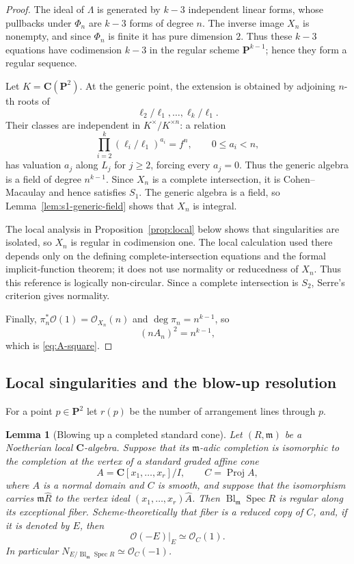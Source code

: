 \documentclass[11pt]{article}
\newtheorem{lemma}[theorem]{Lemma}
\newcommand{\PP}{\mathbf P}
\newcommand{\CC}{\mathbf C}
\newcommand{\OO}{\mathcal O}
\newcommand{\Bl}{\operatorname{Bl}}
\begin{document}
\begin{proof}
The ideal of $\Lambda$ is generated by $k-3$ independent linear forms, whose
pullbacks under $\Phi_n$ are $k-3$ forms of degree $n$.  The inverse image $X_n$
is nonempty, and since $\Phi_n$ is finite it has pure dimension $2$.  Thus these
$k-3$ equations have codimension $k-3$ in the regular scheme $\PP^{k-1}$; hence
they form a regular sequence.

Let $K=\CC(\PP^2)$.  At the generic point, the extension is obtained by adjoining
$n$-th roots of
\[
        \ell_2/\ell_1,\ldots,\ell_k/\ell_1.
\]
Their classes are independent in $K^\times/K^{\times n}$: a relation
\[
 \prod_{i=2}^k(\ell_i/\ell_1)^{a_i}=f^n,
 \qquad 0\le a_i<n,
\]
has valuation $a_j$ along $L_j$ for $j\ge2$, forcing every $a_j=0$.  Thus the
generic algebra is a field of degree $n^{k-1}$.  Since $X_n$ is a complete intersection, it is Cohen--Macaulay and hence satisfies
$S_1$.  The generic algebra is a field, so Lemma~\ref{lem:s1-generic-field}
shows that $X_n$ is integral.

The local analysis in Proposition~\ref{prop:local} below shows that singularities
are isolated, so $X_n$ is regular in codimension one.  The local calculation
used there depends only on the defining complete-intersection equations and the
formal implicit-function theorem; it does not use normality or reducedness of
$X_n$.  Thus this reference is logically non-circular.  Since a complete
intersection is $S_2$, Serre's criterion gives normality.

Finally, $\pi_n^*\OO(1)=\OO_{X_n}(n)$ and $\deg\pi_n=n^{k-1}$, so
\[
        (nA_n)^2=n^{k-1},
\]
which is \eqref{eq:A-square}.
\end{proof}

\subsection{Local singularities and the blow-up resolution}

For a point $p\in\PP^2$ let $r(p)$ be the number of arrangement lines through
$p$.

\begin{lemma}[Blowing up a completed standard cone]\label{lem:completed-cone-blowup}
Let $(R,\mathfrak m)$ be a Noetherian local $\CC$-algebra.  Suppose that its
$\mathfrak m$-adic completion is isomorphic to the completion at the vertex of a
standard graded affine cone
\[
        A=\CC[x_1,\ldots,x_r]/I,
        \qquad C=\operatorname{Proj}A,
\]
where $A$ is a normal domain and $C$ is smooth, and suppose that the isomorphism carries
$\mathfrak m\widehat R$ to the vertex ideal $(x_1,\ldots,x_r)\widehat A$.
Then $\Bl_{\mathfrak m}\operatorname{Spec}R$ is regular along its exceptional
fiber.  Scheme-theoretically that fiber is a reduced copy of $C$, and, if it is
denoted by $E$, then
\[
        \OO(-E)|_E\simeq\OO_C(1).
\]
In particular $N_{E/\Bl_{\mathfrak m}\operatorname{Spec}R}\simeq\OO_C(-1)$.
\end{lemma}
\end{document}
